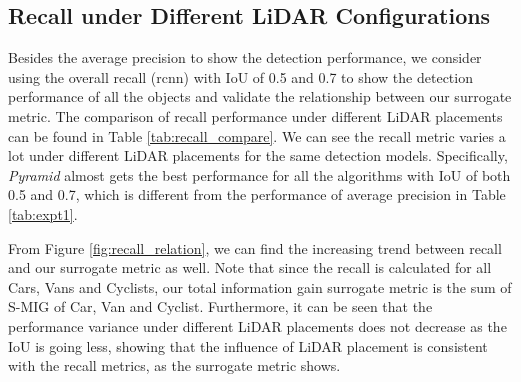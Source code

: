 \documentclass[10pt,twocolumn,letterpaper]{article}
\begin{document}
\subsection{Recall under Different LiDAR Configurations}
Besides the average precision to show the detection performance, we consider using the overall recall (rcnn) with IoU of 0.5 and 0.7 to show the detection performance of all the objects and validate the relationship between our surrogate metric. The comparison of recall performance under different LiDAR placements can be found in Table \ref{tab:recall_compare}. We can see the recall metric varies a lot under different LiDAR placements for the same detection models. Specifically, \textit{Pyramid} almost gets the best performance for all the algorithms with IoU of both 0.5 and 0.7, which is different from the performance of average precision in Table \ref{tab:expt1}.

From Figure \ref{fig:recall_relation}, we can find the increasing trend between recall and our surrogate metric as well. Note that since the recall is calculated for all Cars, Vans and Cyclists, our total information gain surrogate metric is the sum of S-MIG of Car, Van and Cyclist. Furthermore, it can be seen that the performance variance under different LiDAR placements does not decrease as the IoU is going less, showing that the influence of LiDAR placement is consistent with the recall metrics, as the surrogate metric shows.
\end{document}
